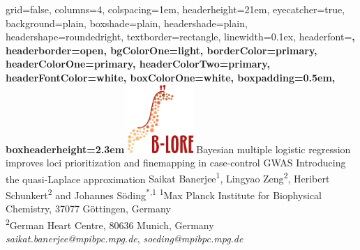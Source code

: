 \documentclass[a0paper,portrait,debug]{baposter}
\begin{document}
\setlength{\belowdisplayskip}{0pt} 
\setlength{\belowdisplayshortskip}{0pt} 
\setlength{\abovedisplayskip}{0pt} 
\setlength{\abovedisplayshortskip}{0pt}


\begin{poster}
{
%
%
	grid=false,
	columns=4,
	colspacing=1em,				%
	headerheight=21em, 				%
	eyecatcher=true,
	background=plain,
  	boxshade=plain,
	headershade=plain,  	
	headershape=roundedright,		%
	textborder=rectangle,			%
	linewidth=0.1ex,				%
        headerfont=\rmfamily\bfseries\large,
	headerborder=open,
	bgColorOne=light, 
	borderColor=primary,
	headerColorOne=primary,
	headerColorTwo=primary,
	headerFontColor=white,
	boxColorOne=white,
	boxpadding=0.5em,					%
	boxheaderheight=2.3em				%
}
{\includegraphics[height=7em]{blore_logo_color_300ppi.png}} %
{\color{primary}Bayesian multiple logistic regression improves loci prioritization and finemapping in case-control GWAS}
{Introducing the quasi-Laplace approximation}
{Saikat Banerjee\textsuperscript{1}, Lingyao Zeng\textsuperscript{2}, Heribert Schunkert\textsuperscript{2} and Johannes S\"oding\textsuperscript{*,1}} %
{
  \textsuperscript{1}Max Planck Institute for Biophysical Chemistry, 37077 G\"ottingen, Germany\\[0.2em]
  \textsuperscript{2}German Heart Centre, 80636 Munich, Germany\\[0.5em]
  {\color{primary} {\LARGE \faEnvelopeSquare} \hspace{0.2em}\emph{saikat.banerjee@mpibpc.mpg.de}, \emph{soeding@mpibpc.mpg.de}}\\[0.5em]
}
\end{poster}
\end{document}
